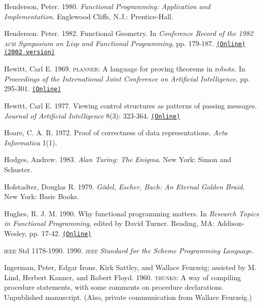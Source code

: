 \documentclass[oneside]{book}
\newcommand{\acronym}[1]{\textsc{\MakeLowercase{#1}}}
\newcommand{\code}[1]{\texttt{#1}}
\begin{document}
 \label{Henderson 1980}
Henderson, Peter. 1980.  \textit{Functional Programming: Application and
Implementation}. Englewood Cliffs, N.J.: Prentice-Hall.

 \label{Henderson 1982}
Henderson. Peter. 1982. Functional Geometry. In \textit{Conference Record of the
1982 \acronym{ACM} Symposium on Lisp and Functional Programming}, pp. 179-187.
\href{http://pmh-systems.co.uk/phAcademic/papers/funcgeo.pdf}{\code{(Online)}}
\href{http://eprints.soton.ac.uk/257577/1/funcgeo2.pdf}{\code{(2002 version)}}

 \label{Hewitt (1969)}
Hewitt, Carl E.  1969.  \acronym{PLANNER}: A language for proving
theorems in robots.  In \textit{Proceedings of the International Joint
Conference on Artificial Intelligence}, pp. 295-301.
\href{http://dspace.mit.edu/handle/1721.1/6171}{\code{(Online)}}

 \label{Hewitt (1977)}
Hewitt, Carl E.  1977.  Viewing control structures as patterns of passing
messages.  \textit{Journal of Artificial Intelligence} 8(3): 323-364.
\href{http://dspace.mit.edu/handle/1721.1/6272}{\code{(Online)}}

 \label{Hoare (1972)}
Hoare, C. A. R. 1972.  Proof of correctness of data representations.
\textit{Acta Informatica} 1(1).

 \label{Hodges 1983}
Hodges, Andrew. 1983.  \textit{Alan Turing: The Enigma}. New York: Simon and
Schuster.

 \label{Hofstadter 1979}
Hofstadter, Douglas R.  1979.  \textit{G\"odel, Escher, Bach: An Eternal Golden
Braid}. New York: Basic Books.

 \label{Hughes 1990}
Hughes, R. J. M.  1990.  Why functional programming matters.  In \textit{Research
Topics in Functional Programming}, edited by David Turner.  Reading, MA:
Addison-Wesley, pp. 17-42.
\href{http://www.cs.kent.ac.uk/people/staff/dat/miranda/whyfp90.pdf}{\code{(Online)}}

 \label{IEEE 1990}
\acronym{IEEE} Std 1178-1990.  1990.  \textit{\acronym{IEEE} Standard for the
Scheme Programming Language}.

 \label{Ingerman et al. 1960}
Ingerman, Peter, Edgar Irons, Kirk Sattley, and Wallace Feurzeig; assisted by
M. Lind, Herbert Kanner, and Robert Floyd.  1960.  \acronym{THUNKS}: A way of
compiling procedure statements, with some comments on procedure declarations.
Unpublished manuscript.  (Also, private communication from Wallace Feurzeig.)
\end{document}
